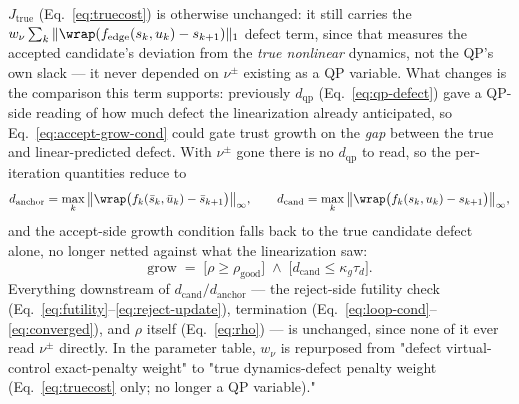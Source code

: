 $J_{\text{true}}$ (Eq.~\eqref{eq:truecost}) is otherwise unchanged: it still
carries the $w_\nu\sum_k\|\wrap(f_{\text{edge}}(s_k,u_k)-s_{k+1})\|_1$ defect
term, since that measures the accepted candidate's deviation from the
\emph{true nonlinear} dynamics, not the QP's own slack --- it never depended
on $\nu^\pm$ existing as a QP variable. What changes is the comparison this
term supports: previously $d_{\mathrm{qp}}$ (Eq.~\eqref{eq:qp-defect}) gave a
QP-side reading of how much defect the linearization already anticipated, so
Eq.~\eqref{eq:accept-grow-cond} could gate trust growth on the \emph{gap}
between the true and linear-predicted defect. With $\nu^\pm$ gone there is no
$d_{\mathrm{qp}}$ to read, so the per-iteration quantities reduce to
\begin{equation}
d_{\mathrm{anchor}} = \max_k \big\| \wrap\big(f_k(\bar s_k,\bar u_k) - \bar s_{k+1}\big) \big\|_\infty,
\qquad
d_{\mathrm{cand}} = \max_k \big\| \wrap\big(f_k( s_k, u_k) - s_{k+1}\big) \big\|_\infty,
\label{eq:defects-nonu}
\end{equation}
and the accept-side growth condition falls back to the true candidate defect
alone, no longer netted against what the linearization saw:
\begin{equation}
\mathrm{grow} \;=\;
\big[\rho \ge \rho_{\mathrm{good}}\big] \;\wedge\;
\big[d_{\mathrm{cand}} \le \kappa_g \tau_d\big].
\label{eq:accept-grow-cond-nonu}
\end{equation}
Everything downstream of $d_{\mathrm{cand}}/d_{\mathrm{anchor}}$ --- the
reject-side futility check (Eq.~\eqref{eq:futility}--\eqref{eq:reject-update}),
termination (Eq.~\eqref{eq:loop-cond}--\eqref{eq:converged}), and $\rho$
itself (Eq.~\eqref{eq:rho}) --- is unchanged, since none of it ever read
$\nu^\pm$ directly. In the parameter table, $w_\nu$ is repurposed from "defect
virtual-control exact-penalty weight" to "true dynamics-defect penalty weight
(Eq.~\eqref{eq:truecost} only; no longer a QP variable)."
